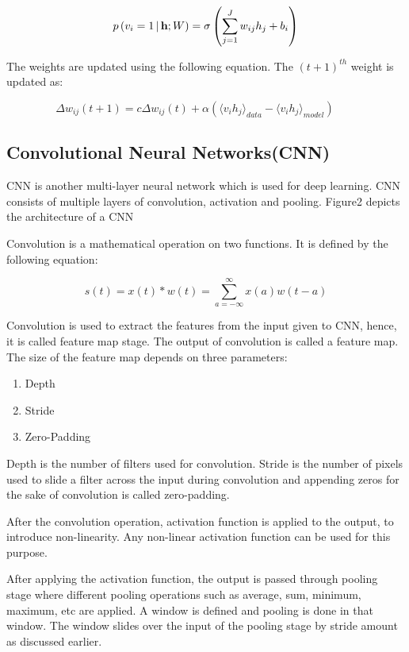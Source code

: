\documentclass[sigconf]{acmart}
\begin{document}
\begin{equation} p\left ( {v_{i}=1}\thinspace \vert \thinspace {\mathbf {h};W}\right ) =\sigma \left ( \sum \limits _{j=1}^J {w_{ij}h_{j}+b_{i}} \right )\end{equation}

The weights are updated using the following equation. The $(t+1)^{th}$ weight is updated as:

\begin{equation} \Delta w_{ij}\left ( t+1 \right )=c\Delta w_{ij}\left ( t \right )+\alpha \left (\langle v_i h_j \rangle _{data}-\langle v_i h_j \rangle _{model} \right )\qquad\end{equation}

\subsection{Convolutional Neural Networks(CNN)}
CNN is another multi-layer neural network which is used for deep learning. CNN consists of multiple layers of convolution, activation and pooling. Figure2  depicts the architecture of a CNN


Convolution is a mathematical operation on two functions. It is defined by the following equation:

\begin{equation}
    s(t) = x(t)*w(t) = \sum^{\infty}_{a = -\infty}x(a)w(t-a)
\end{equation}

Convolution is used to extract the features from the input given to CNN, hence, it is called feature map stage. The output of convolution is called a feature map. The size of the feature map depends on three parameters:
\begin{enumerate}
    \item Depth
    \item Stride
    \item Zero-Padding
\end{enumerate}

Depth is the number of filters used for convolution. Stride is the number of pixels used to slide a filter across the input during convolution and appending zeros for the sake of convolution is called zero-padding.

After the convolution operation, activation function is applied to the output, to introduce non-linearity. Any non-linear activation function can be used for this purpose. 

After applying the activation function, the output is passed through pooling stage where different pooling operations such as average, sum, minimum, maximum, etc are applied. A window is defined and pooling is done in that window. The window slides over the input of the pooling stage by stride amount as discussed earlier.
\end{document}
